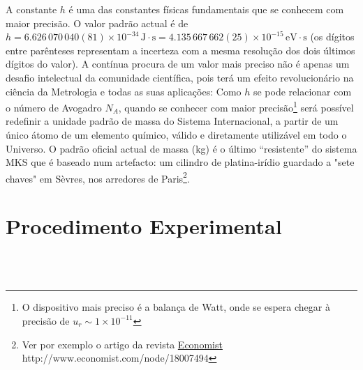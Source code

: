 \documentclass[a4paper,12pt]{article}  %
\begin{document}
A constante $h$ é uma das constantes físicas fundamentais que se conhecem com maior precisão.
O valor padrão actual é de $h=6.626\,070\,040(81) \times 10^{-34}\,\textrm{J}\cdot \textrm{s}=4.135\,667\,662(25)\times 10^{-15}\,\textrm{eV}\cdot\textrm{s}$ (os  dígitos entre parênteses representam a incerteza com a mesma resolução dos dois últimos dígitos do valor).  A contínua procura de um valor mais preciso não é apenas um  desafio intelectual da comunidade científica, pois  terá um efeito  revolucionário na ciência da Metrologia e todas as suas aplicações: 
 Como $h$ se pode relacionar com o número de Avogadro  $N_A$, quando se conhecer com maior precisão\footnote{O dispositivo mais preciso é a balança de Watt, onde se espera chegar à precisão de $u_r \sim 1\times 10^{-11}$} será possível redefinir a unidade padrão de massa do Sistema Internacional, a partir de um único átomo de um elemento químico, válido e diretamente utilizável em todo o Universo. 
 O padrão oficial actual de massa (kg) é o último ``resistente''  do sistema MKS que é baseado num artefacto: um cilindro de platina-irídio guardado a "sete chaves" em Sèvres, nos arredores de Paris\footnote{Ver por exemplo o artigo da revista \href{http://www.economist.com/node/18007494}{Economist} http://www.economist.com/node/18007494}.   
 
\section{\sf Procedimento Experimental}

\\ \\
\end{document}
